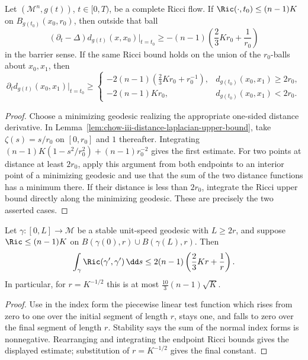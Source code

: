 \begin{theorem}
\label{thm:chow-iii-changing-distances}
Let \((\mathcal M^n,g(t))\), \(t\in[0,T)\), be a complete Ricci flow.
If \(\Ric(\cdot,t_0)\le(n-1)K\) on \(B_{g(t_0)}(x_0,r_0)\), then outside
that ball
\[
 (\partial_t-\Delta)d_{g(t)}(x,x_0)|_{t=t_0}
 \ge-(n-1)\left(\frac23Kr_0+\frac1{r_0}\right)
\]
in the barrier sense.  If the same Ricci bound holds on the union of the
\(r_0\)-balls about \(x_0,x_1\), then
\[
 \partial_td_{g(t)}(x_0,x_1)|_{t=t_0}\ge
 \begin{cases}
 -2(n-1)(\frac23Kr_0+r_0^{-1}),&d_{g(t_0)}(x_0,x_1)\ge2r_0,\\
 -2(n-1)Kr_0,&d_{g(t_0)}(x_0,x_1)<2r_0.
 \end{cases}
\]
\end{theorem}
\begin{proof}
\sketch Choose a minimizing geodesic realizing the appropriate one-sided distance
derivative.  In Lemma~\ref{lem:chow-iii-distance-laplacian-upper-bound}, take
\(\zeta(s)=s/r_0\) on \([0,r_0]\) and \(1\) thereafter.  Integrating
\((n-1)K(1-s^2/r_0^2)+(n-1)r_0^{-2}\) gives the first estimate.  For two
points at distance at least \(2r_0\), apply this argument from both endpoints
to an interior point of a minimizing geodesic and use that the sum of the two
distance functions has a minimum there.  If their distance is less than
\(2r_0\), integrate the Ricci upper bound directly along the minimizing
geodesic.  These are precisely the two asserted cases.
\end{proof}

\begin{proposition}
\label{prop:chow-iii-ricci-integral-stable-geodesic}
Let \(\gamma:[0,L]\to\mathcal M\) be a stable unit-speed geodesic with
\(L\ge2r\), and suppose
\(\Ric\le(n-1)K\) on \(B(\gamma(0),r)\cup B(\gamma(L),r)\).  Then
\[
 \int_\gamma\Ric(\gamma',\gamma')\,\dd s
 \le2(n-1)\left(\frac23Kr+\frac1r\right).
\]
In particular, for \(r=K^{-1/2}\) this is at most
\(\frac{10}{3}(n-1)\sqrt K\).
\end{proposition}
\begin{proof}
\sketch Use in the index form the piecewise linear test function which rises from
zero to one over the initial segment of length \(r\), stays one, and falls to
zero over the final segment of length \(r\).  Stability says the sum of the
normal index forms is nonnegative.  Rearranging and integrating the endpoint
Ricci bounds gives the displayed estimate; substitution of \(r=K^{-1/2}\)
gives the final constant.
\end{proof}

